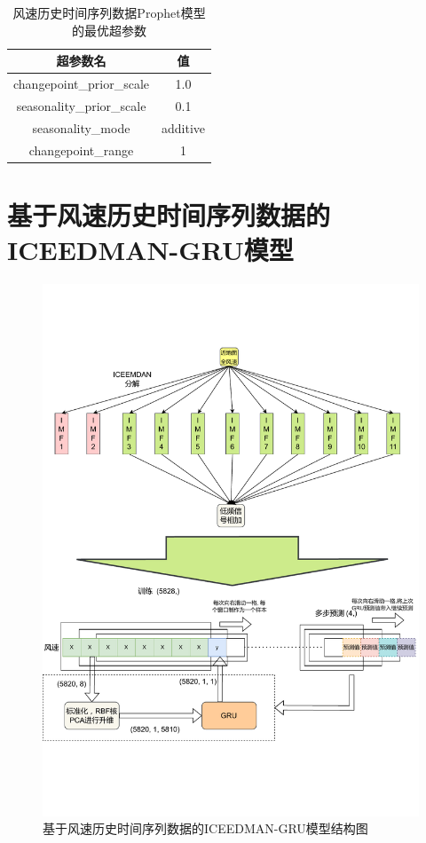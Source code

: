 \documentclass[AutoFakeBold]{LZUThesis}
\begin{document}
\begin{table}[H]
    \centering
    \caption{风速历史时间序列数据Prophet模型的最优超参数}
    \begin{tabular}{cc}
    \toprule
    超参数名 & 值 \\
    \midrule
    changepoint\_prior\_scale & 1.0 \\
    seasonality\_prior\_scale & 0.1 \\
    seasonality\_mode & additive \\
    changepoint\_range & 1 \\
    \bottomrule
    \end{tabular}
    \label{prophet_param}
\end{table}

\section{基于风速历史时间序列数据的ICEEDMAN-GRU模型}
\begin{figure}[H]
	\centering
    \includegraphics[width=1\textwidth]{figures/ICEEMDAN-GRU-Wind.pdf}
    \caption{基于风速历史时间序列数据的ICEEDMAN-GRU模型结构图}
    \label{fig_ICEEMDAN_GRU_Wind}
\end{figure}
\end{document}
